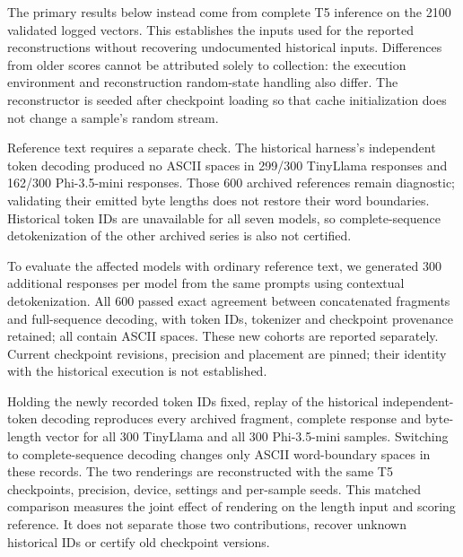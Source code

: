 \documentclass[electronics,article,submit,pdftex,moreauthors]{Definitions/mdpi}
\begin{document}
The primary results below instead come from complete T5 inference on the 2100 validated logged vectors. This establishes the inputs used for the reported reconstructions without recovering undocumented historical inputs. Differences from older scores cannot be attributed solely to collection: the execution environment and reconstruction random-state handling also differ. The reconstructor is seeded after checkpoint loading so that cache initialization does not change a sample's random stream.

Reference text requires a separate check. The historical harness's independent token decoding produced no ASCII spaces in 299/300 TinyLlama responses and 162/300 Phi-3.5-mini responses. Those 600 archived references remain diagnostic; validating their emitted byte lengths does not restore their word boundaries. Historical token IDs are unavailable for all seven models, so complete-sequence detokenization of the other archived series is also not certified.

To evaluate the affected models with ordinary reference text, we generated 300 additional responses per model from the same prompts using contextual detokenization. All 600 passed exact agreement between concatenated fragments and full-sequence decoding, with token IDs, tokenizer and checkpoint provenance retained; all contain ASCII spaces. These new cohorts are reported separately. Current checkpoint revisions, precision and placement are pinned; their identity with the historical execution is not established.

Holding the newly recorded token IDs fixed, replay of the historical independent-token decoding reproduces every archived fragment, complete response and byte-length vector for all 300 TinyLlama and all 300 Phi-3.5-mini samples. Switching to complete-sequence decoding changes only ASCII word-boundary spaces in these records. The two renderings are reconstructed with the same T5 checkpoints, precision, device, settings and per-sample seeds. This matched comparison measures the joint effect of rendering on the length input and scoring reference. It does not separate those two contributions, recover unknown historical IDs or certify old checkpoint versions.
\end{document}
